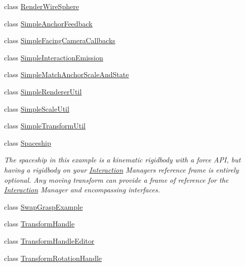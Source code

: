 \begin{DoxyCompactItemize}
\item 
class \mbox{\hyperlink{class_leap_1_1_unity_1_1_examples_1_1_render_wire_sphere}{Render\+Wire\+Sphere}}
\item 
class \mbox{\hyperlink{class_leap_1_1_unity_1_1_examples_1_1_simple_anchor_feedback}{Simple\+Anchor\+Feedback}}
\item 
class \mbox{\hyperlink{class_leap_1_1_unity_1_1_examples_1_1_simple_facing_camera_callbacks}{Simple\+Facing\+Camera\+Callbacks}}
\item 
class \mbox{\hyperlink{class_leap_1_1_unity_1_1_examples_1_1_simple_interaction_emission}{Simple\+Interaction\+Emission}}
\item 
class \mbox{\hyperlink{class_leap_1_1_unity_1_1_examples_1_1_simple_match_anchor_scale_and_state}{Simple\+Match\+Anchor\+Scale\+And\+State}}
\item 
class \mbox{\hyperlink{class_leap_1_1_unity_1_1_examples_1_1_simple_renderer_util}{Simple\+Renderer\+Util}}
\item 
class \mbox{\hyperlink{class_leap_1_1_unity_1_1_examples_1_1_simple_scale_util}{Simple\+Scale\+Util}}
\item 
class \mbox{\hyperlink{class_leap_1_1_unity_1_1_examples_1_1_simple_transform_util}{Simple\+Transform\+Util}}
\item 
class \mbox{\hyperlink{class_leap_1_1_unity_1_1_examples_1_1_spaceship}{Spaceship}}
\begin{DoxyCompactList}\small\item\em The spaceship in this example is a kinematic rigidbody with a force A\+PI, but having a rigidbody on your \mbox{\hyperlink{namespace_leap_1_1_unity_1_1_interaction}{Interaction}} Manager\textquotesingle{}s reference frame is entirely optional. Any moving transform can provide a frame of reference for the \mbox{\hyperlink{namespace_leap_1_1_unity_1_1_interaction}{Interaction}} Manager and encompassing interfaces. \end{DoxyCompactList}\item 
class \mbox{\hyperlink{class_leap_1_1_unity_1_1_examples_1_1_swap_grasp_example}{Swap\+Grasp\+Example}}
\item 
class \mbox{\hyperlink{class_leap_1_1_unity_1_1_examples_1_1_transform_handle}{Transform\+Handle}}
\item 
class \mbox{\hyperlink{class_leap_1_1_unity_1_1_examples_1_1_transform_handle_editor}{Transform\+Handle\+Editor}}
\item 
class \mbox{\hyperlink{class_leap_1_1_unity_1_1_examples_1_1_transform_rotation_handle}{Transform\+Rotation\+Handle}}

\end{DoxyCompactItemize}
